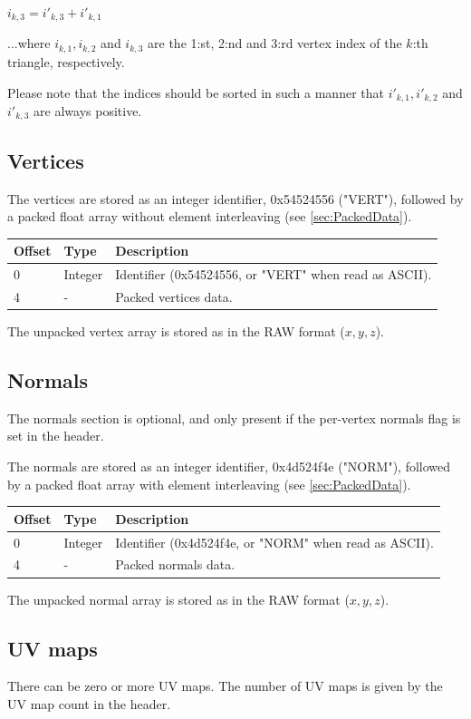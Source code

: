 $i_{k,3} = i'_{k,3} + i'_{k,1}$

...where $i_{k,1}, i_{k,2}$ and $i_{k,3}$ are the 1:st, 2:nd and 3:rd vertex index of the
$k$:th triangle, respectively.

Please note that the indices should be sorted in such a manner that $i'_{k,1}, i'_{k,2}$
and $i'_{k,3}$ are always positive.

\subsection{Vertices}
The vertices are stored as an integer identifier, 0x54524556 ("VERT"), followed
by a packed float array without element interleaving (see \ref{sec:PackedData}).

\begin{tabular}{|l|l|l|}\hline
\textbf{Offset} &  \textbf{Type} & \textbf{Description}\\ \hline
0 & Integer & Identifier (0x54524556, or "VERT" when read as ASCII).\\ \hline
4 & - & Packed vertices data.\\ \hline
\end{tabular}

The unpacked vertex array is stored as in the RAW format ($x, y, z$).

\subsection{Normals}
The normals section is optional, and only present if the per-vertex normals
flag is set in the header.

The normals are stored as an integer identifier, 0x4d524f4e ("NORM"), followed
by a packed float array with element interleaving (see \ref{sec:PackedData}).

\begin{tabular}{|l|l|l|}\hline
\textbf{Offset} &  \textbf{Type} & \textbf{Description}\\ \hline
0 & Integer & Identifier (0x4d524f4e, or "NORM" when read as ASCII).\\ \hline
4 & - & Packed normals data.\\ \hline
\end{tabular}

The unpacked normal array is stored as in the RAW format ($x, y, z$).

\subsection{UV maps}
There can be zero or more UV maps. The number of UV maps is given by the
UV map count in the header.

